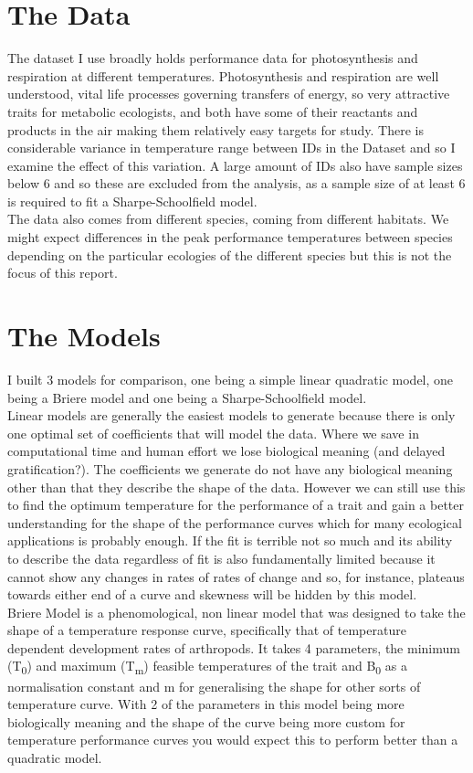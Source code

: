\documentclass[12pt]{article}\usepackage[]{graphicx}\usepackage[]{color}
\begin{document}
  \section{The Data}
  The dataset I use broadly holds performance data for photosynthesis and respiration at different temperatures. 
  Photosynthesis and respiration are well understood, vital life processes governing transfers of energy, so very attractive traits for metabolic ecologists,
  and both have some of their reactants and products in the air making them relatively easy targets for study. There is considerable variance 
  in temperature range between IDs in the Dataset and so I examine the effect of this variation. 
  A large amount of IDs also have sample sizes below 6 
  and so these are excluded from the analysis, as a sample size of at least 6 is required to fit a Sharpe-Schoolfield model. \\
  The data also comes from different species, coming from different habitats. We might expect differences in the peak performance 
  temperatures between species depending on the particular ecologies of the different species but this is not the focus 
  of this report. \\
 
  \section{The Models}
  I built 3 models for comparison, one being a simple linear quadratic model, one being a Briere model and one being a Sharpe-Schoolfield model.\\
  Linear models are generally the easiest models to generate because there is only one optimal set of coefficients that will model the data. 
  Where we save in computational time and human effort we lose biological meaning (and delayed gratification?). The coefficients we generate 
  do not have any biological meaning other than that they describe the shape of the data. However we can still use this to find the optimum 
  temperature for the performance of a trait and gain a better understanding for the shape of the performance curves which for many ecological 
  applications is probably enough. If the fit is terrible not so much and its ability to describe the data regardless of fit is also 
  fundamentally limited because it cannot show any changes in rates of rates of change and so, for instance, plateaus towards either end of a 
  curve and skewness will be hidden by this model.\\
  Briere Model \cite{Brierea} is a phenomological, non linear model that was designed to take the shape of a temperature response curve, 
  specifically that of temperature dependent development rates of arthropods. It takes 4 parameters, the minimum (T\textsubscript{0}) and maximum (T\textsubscript{m}) 
  feasible temperatures of the trait and B\textsubscript{0} as a normalisation constant and m for generalising the shape for other sorts of temperature
  curve. With 2 of the parameters in this model being more biologically meaning and the shape of the curve being more custom for temperature
  performance curves you would expect this to perform better than a quadratic model.\\
\end{document}
